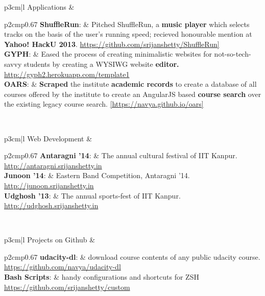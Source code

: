 \documentclass[a4paper]{article} %
\newcommand{\projectlist}[2]{
    \vspace{0.2cm}
    \begin{tabular}{p{3cm}|l}
        \textcolor{NavyBlue}{\small #1} & \footnotesize{#2}\\
    \end{tabular}
}
\begin{document}
\projectlist
    {Applications}
    {
        \begin{tabular}{p{2cm}p{0.67\linewidth}}
            \textbf{ShuffleRun}:
            & Pitched ShuffleRun, a \textbf{music player} which selects tracks on the basis of the user's
            running speed; recieved honourable mention at \textbf{Yahoo! HackU 2013}.
            \href{https://github.com/srijanshetty/ShuffleRun} {https://github.com/srijanshetty/ShuffleRun]}\\

            \textbf{GYPH}:
            & Eased the process of creating minimalistic websites for not-so-tech-savvy students
            by creating a WYSIWG website \textbf{editor.} \href{http://gyph2.herokuapp.com/template1}
            {http://gyph2.herokuapp.com/template1}\\

            \textbf{OARS}:
            & \textbf{Scraped} the institute \textbf{academic records} to create a database of all courses offered by the
            institute to create an AngularJS based \textbf{course search} over the existing legacy course search.
            {\href{https://navya.github.io/oars}{\footnotesize{[https://navya.github.io/oars]}}}
         \end{tabular}
     }

\projectlist
    {Web Development}
    {
        \begin{tabular}{p{2cm}p{0.67\linewidth}}
             \textbf{Antaragni '14}: & The annual cultural festival of IIT Kanpur.
             \href{http://antaragni.srijanshetty.in} {http://antaragni.srijanshetty.in}\\
             \textbf{Junoon '14}: & Eastern Band Competition, Antaragni '14.
             \href{http://junoon.srijanshetty.in}{http://junoon.srijanshetty.in}\\
            \textbf{Udghosh '13}: & The annual sports-fest of IIT Kanpur.
             \href{http://udghosh.srijanshetty.in}{http://udghosh.srijanshetty.in}\\
         \end{tabular}
    }

\projectlist
    {Projects on Github}
    {
        \begin{tabular}{p{2cm}p{0.67\linewidth}}
             \textbf{udacity-dl}: & download course contents of any public udacity course.
             \href{https://github.com/navya/udacity-dl} {https://github.com/navya/udacity-dl}\\
             \textbf{Bash Scripts}: & handy configurations and shortcuts for ZSH
             \href{https://github.com/srijanshetty/custom} {https://github.com/srijanshetty/custom}\\
         \end{tabular}
    }
\end{document}
